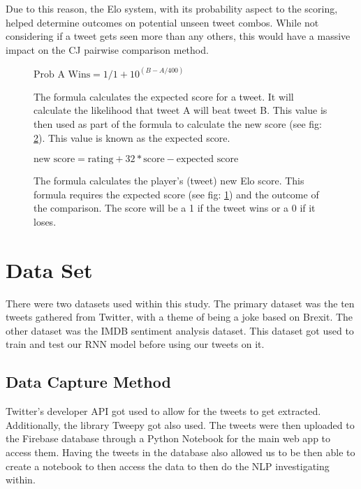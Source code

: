 	Due to this reason, the Elo system, with its probability aspect to the scoring, helped determine outcomes on potential unseen tweet combos. While not considering if a tweet gets seen more than any others, this would have a massive impact on the CJ pairwise comparison method.
	
	
	\begin{figure}[h]
		\centering
		 $\text{Prob A Wins} = 1/1+10^{(B-A/400)}$
		\caption{The formula calculates the expected score for a tweet. It will calculate the likelihood that tweet A will beat tweet B. This value is then used as part of the formula to calculate the new score (see fig: \ref{fig:elo_maths_2}). This value is known as the expected score.}
		\label{fig:elo_maths_1}
	\end{figure}

\begin{figure}[h]
	\centering

	$\text{new score} = \text{rating} + 32 *  \text{score} - \text{expected score}$
	\caption{The formula calculates the player's (tweet) new Elo score. This formula requires the expected score (see fig: \ref{fig:elo_maths_1}) and the outcome of the comparison. The score will be a 1 if the tweet wins or a 0 if it loses.}
	\label{fig:elo_maths_2}
\end{figure}
	
	\section{Data Set}
		There were two datasets used within this study. The primary dataset was the ten tweets gathered from Twitter, with a theme of being a joke based on Brexit. The other dataset was the IMDB sentiment analysis dataset. This dataset got used to train and test our RNN model before using our tweets on it. 
	
	\subsection{Data Capture Method}
		Twitter's developer API got used to allow for the tweets to get extracted. Additionally, the library Tweepy \cite{roesslein2020tweepy} got also used. The tweets were then uploaded to the Firebase database \cite{moroney2017firebase} through a Python Notebook for the main web app to access them. Having the tweets in the database also allowed us to be then able to create a notebook to then access the data to then do the NLP investigating within.
	
